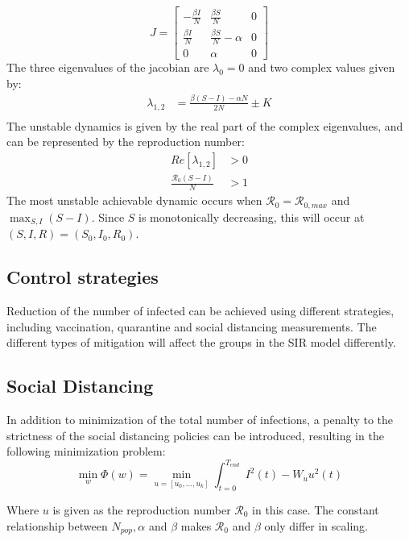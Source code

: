 \begin{equation}
    J = 
    \begin{bmatrix}
    -\frac{\beta I}{N} & \frac{\beta S}{N} & 0\\
    \frac{\beta I}{N} & \frac{\beta S}{N} - \alpha & 0 \\
    0 & \alpha & 0
    \end{bmatrix}
\end{equation}
The three eigenvalues of the jacobian are $\lambda_0 = 0$ and two complex values given by:
\begin{align}
    \lambda_{1,2} &= \frac{\beta(S-I)-\alpha N}{2N}  \pm K\\
\end{align}
The unstable dynamics is given by the real part of the complex eigenvalues, and can be represented by the reproduction number:
\begin{align}
    Re[\lambda_{1,2}] &> 0\\
    \frac{\mathscr{R}_0(S-I)}{N} &> 1
\end{align}
The most unstable achievable dynamic occurs when $\mathscr{R}_0 = \mathscr{R}_{0, max}$ and $\max_{S, I} (S-I)$. Since $S$ is monotonically decreasing, this will occur at $(S, I, R) = (S_0, I_0, R_0)$.

\subsection{Control strategies}
Reduction of the number of infected can be achieved using different strategies, including vaccination, quarantine and social distancing measurements. The different types of mitigation will affect the groups in the SIR model differently.  

\subsection{Social Distancing}
In addition to minimization of the total number of infections, a penalty to the strictness of the social distancing policies can be introduced, resulting in the following minimization problem:
\begin{equation}
    \min_{w} \Phi(w) = \min_{u = [u_0, \dots, u_k]} \int_{t=0}^{T_{end}} I^2(t) - W_u u^2(t)
\end{equation}

Where $u$ is given as the reproduction number $\mathscr{R}_0$ in this case. The constant relationship between $N_{pop}, \alpha$ and $\beta$ makes $\mathscr{R}_0$ and $\beta$ only differ in scaling. 


